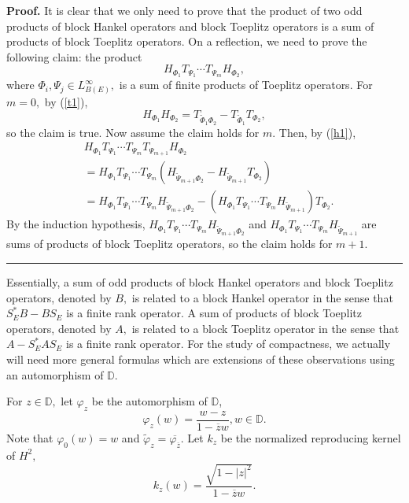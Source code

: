 \documentclass{article}%
\newenvironment{proof}[1][Proof]{\noindent\textbf{#1.} }{\ \rule{0.5em}{0.5em}}
\begin{document}
\begin{proof}
It is clear that we only need to prove that the product of two odd products of
block Hankel operators and block Toeplitz operators is a sum of products of
block Toeplitz operators. On a reflection, we need to prove the following
claim: the product%
\[
H_{\Phi_{1}}T_{\Psi_{1}}\cdots T_{\Psi_{m}}H_{\Phi_{2}},
\]
where $\Phi_{i},\Psi_{j}\in L_{B(E)}^{\infty},$ is a sum of finite products of
Toeplitz operators. For $m=0,$ by (\ref{t1}),%
\[
H_{\Phi_{1}}H_{\Phi_{2}}=T_{\widetilde{\Phi}_{1}\Phi_{2}}-T_{\widetilde{\Phi
}_{1}}T_{\Phi_{2}},
\]
so the claim is true. Now assume the claim holds for $m.$ Then, by
(\ref{h1}),
\begin{align*}
&  H_{\Phi_{1}}T_{\Psi_{1}}\cdots T_{\Psi_{m}}T_{\Psi_{m+1}}H_{\Phi_{2}}\\
&  =H_{\Phi_{1}}T_{\Psi_{1}}\cdots T_{\Psi_{m}}(H_{\widetilde{\Psi}_{m+1}%
\Phi_{2}}-H_{\widetilde{\Psi}_{m+1}}T_{\Phi_{2}})\\
&  =H_{\Phi_{1}}T_{\Psi_{1}}\cdots T_{\Psi_{m}}H_{\widetilde{\Psi}_{m+1}%
\Phi_{2}}-\left(  H_{\Phi_{1}}T_{\Psi_{1}}\cdots T_{\Psi_{m}}H_{\widetilde
{\Psi}_{m+1}}\right)  T_{\Phi_{2}}.
\end{align*}
By the induction hypothesis, $H_{\Phi_{1}}T_{\Psi_{1}}\cdots T_{\Psi_{m}%
}H_{\widetilde{\Psi}_{m+1}\Phi_{2}}$ and $H_{\Phi_{1}}T_{\Psi_{1}}\cdots
T_{\Psi_{m}}H_{\widetilde{\Psi}_{m+1}}$ are sums of products of block Toeplitz
operators, so the claim holds for $m+1.$
\end{proof}

Essentially, a sum of odd products of block Hankel operators and block
Toeplitz operators, denoted by $B,$ is related to a block Hankel operator in
the sense that $S_{E}^{\ast}B-BS_{E}$ is a finite rank operator. A sum of
products of block Toeplitz operators, denoted by $A,$ is related to a block
Toeplitz operator in the sense that $A-S_{E}^{\ast}AS_{E}$ is a finite rank
operator. For the study of compactness, we actually will need more general
formulas which are extensions of these observations using an automorphism of
$\mathbb{D}$.

For $z\in\mathbb{D},$ let $\varphi_{z}$ be the automorphism of $\mathbb{D}$,
\[
\varphi_{z}(w)=\frac{w-z}{1-\overline{z}w},w\in\mathbb{D}.
\]
Note that $\varphi_{0}(w)=w$ and $\widetilde{\varphi}_{z}=\overline
{\varphi_{\overline{z}}}.$ Let $k_{z}$ be the normalized reproducing kernel of
$H^{2},$%
\[
k_{z}(w)=\frac{\sqrt{1-\left\vert z\right\vert ^{2}}}{1-\overline{z}w}.
\]
\end{document}
